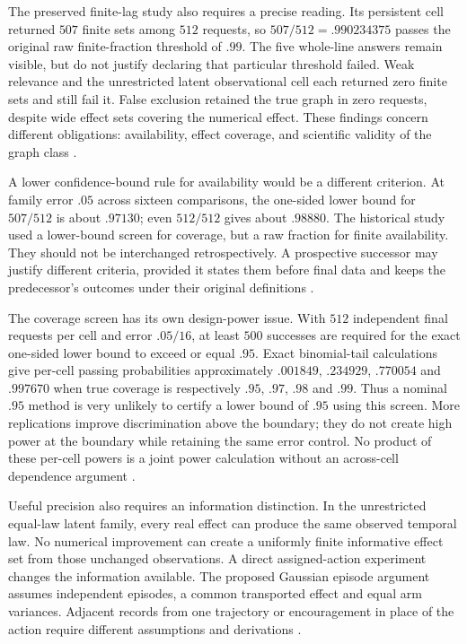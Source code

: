 The preserved finite-lag study also requires a precise reading. Its
persistent cell returned $507$ finite sets among $512$ requests, so
$507/512=.990234375$ passes the original raw finite-fraction threshold
of $.99$. The five whole-line answers remain visible, but do not justify
declaring that particular threshold failed. Weak relevance and the
unrestricted latent observational cell each returned zero finite sets
and still fail it. False exclusion retained the true graph in zero
requests, despite wide effect sets covering the numerical effect.
These findings concern different obligations: availability, effect
coverage, and scientific validity of the graph class
\cite{exec13_temporal_design}.

A lower confidence-bound rule for availability would be a different
criterion. At family error $.05$ across sixteen comparisons, the
one-sided lower bound for $507/512$ is about $.97130$; even $512/512$
gives about $.98880$. The historical study used a lower-bound screen
for coverage, but a raw fraction for finite availability. They should
not be interchanged retrospectively. A prospective successor may
justify different criteria, provided it states them before final data
and keeps the predecessor's outcomes under their original definitions
\cite{exec13_temporal_design}.

The coverage screen has its own design-power issue. With $512$
independent final requests per cell and error $.05/16$, at least $500$
successes are required for the exact one-sided lower bound to exceed
or equal $.95$. Exact binomial-tail calculations give per-cell passing
probabilities approximately $.001849$, $.234929$, $.770054$ and
$.997670$ when true coverage is respectively $.95$, $.97$, $.98$ and
$.99$. Thus a nominal $.95$ method is very unlikely to certify a
lower bound of $.95$ using this screen. More replications improve
discrimination above the boundary; they do not create high power at
the boundary while retaining the same error control. No product of
these per-cell powers is a joint power calculation without an
across-cell dependence argument \cite{exec13_temporal_design}.

Useful precision also requires an information distinction. In the
unrestricted equal-law latent family, every real effect can produce
the same observed temporal law. No numerical improvement can create
a uniformly finite informative effect set from those unchanged
observations. A direct assigned-action experiment changes the
information available. The proposed Gaussian episode argument assumes
independent episodes, a common transported effect and equal arm
variances. Adjacent records from one trajectory or encouragement in
place of the action require different assumptions and derivations
\cite{exec13_temporal_design}.

